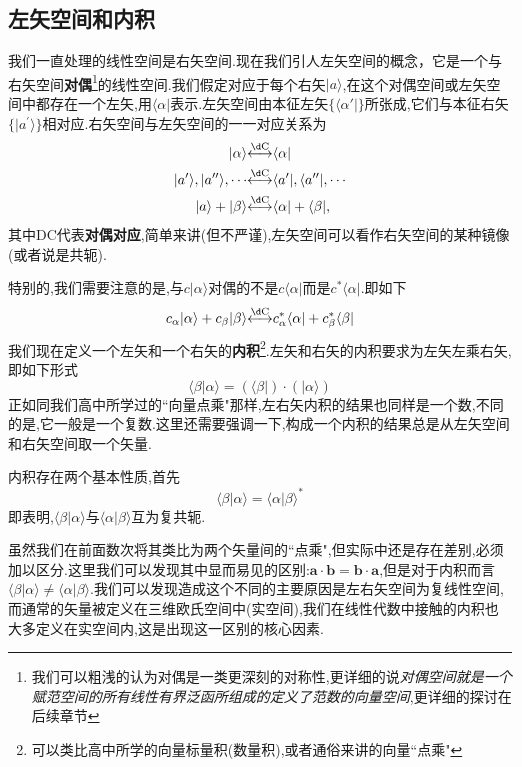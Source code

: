 \subsection{左矢空间和内积}
我们一直处理的线性空间是右矢空间.现在我们引人左矢空间的概念，它是一个与右矢空间\textbf{对偶}\footnote{我们可以粗浅的认为对偶是一类更深刻的对称性,更详细的说\textit{对偶空间就是一个赋范空间的所有线性有界泛函所组成的定义了范数的向量空间},更详细的探讨在后续章节}的线性空间.我们假定对应于每个右矢$|a\rangle$,在这个对偶空间或左矢空间中都存在一个左矢,用$\langle\alpha|$表示.左矢空间由本征左矢$\{\langle\alpha'|\}$所张成,它们与本征右矢$\{|a^{\prime}\rangle\}$相对应.右矢空间与左矢空间的一一对应关系为
\begin{equation}
	\begin{aligned}|\alpha\rangle&\overset{\mathrm{\d C}}{\operatorname*{\longleftrightarrow}}\langle\alpha|\\| a^{\prime}\rangle,| a^{\prime\prime}\rangle,\cdotp\cdotp\cdotp&\overset{\mathrm{\d C}}{\operatorname*{\longleftrightarrow}}\langle a^{\prime}|,\langle a^{\prime\prime}|,\cdotp\cdotp\cdotp\\| a\rangle+|\beta\rangle&\overset{\mathrm{\d C}}{\operatorname*{\longleftrightarrow}}\langle\alpha|+\langle\beta|,\end{aligned}
\end{equation}
其中DC代表\textbf{对偶对应},简单来讲(但不严谨),左矢空间可以看作右矢空间的某种镜像(或者说是共轭).

特别的,我们需要注意的是,与$c|\alpha\rangle$对偶的不是$c\langle\alpha|$而是$c^*\langle\alpha|$.即如下
\begin{equation}
	c_\alpha|\alpha\rangle+c_\beta|\beta\rangle\overset{\mathrm{\d C}}{\operatorname*{\longleftrightarrow}}c_\alpha^*\langle\alpha|+c_\beta^*\langle\beta|
\end{equation}
我们现在定义一个左矢和一个右矢的\textbf{内积}\footnote{可以类比高中所学的向量标量积(数量积),或者通俗来讲的向量``点乘"}.左矢和右矢的内积要求为左矢左乘右矢,即如下形式
\begin{equation}
	\langle\beta|\alpha\rangle=(\langle\beta|)\cdot(|\alpha\rangle)
\end{equation}
正如同我们高中所学过的``向量点乘"那样,左右矢内积的结果也同样是一个数,不同的是,它一般是一个复数.这里还需要强调一下,构成一个内积的结果总是从左矢空间和右矢空间取一个矢量.

内积存在两个基本性质,首先
\begin{equation}\label{eq1.9}
	\langle\beta|\alpha\rangle=\langle\alpha|\beta\rangle^*
\end{equation}
即表明,$\langle\beta|\alpha\rangle$与$\langle\alpha|\beta\rangle$互为复共轭.\\
\begin{remark}
	虽然我们在前面数次将其类比为两个矢量间的``点乘",但实际中还是存在差别,必须加以区分.这里我们可以发现其中显而易见的区别:$\mathbf{a}\cdot\mathbf{b}=\mathbf{b}\cdot\mathbf{a}$,但是对于内积而言$\langle\beta|\alpha\rangle\ne\langle\alpha|\beta\rangle$.我们可以发现造成这个不同的主要原因是左右矢空间为复线性空间,而通常的矢量被定义在三维欧氏空间中(实空间),我们在线性代数中接触的内积也大多定义在实空间内,这是出现这一区别的核心因素.
\end{remark}

